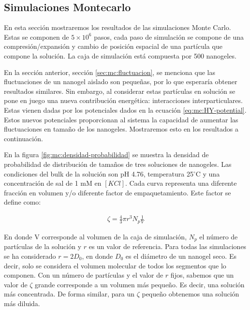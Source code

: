 	
	\subsection{Simulaciones Montecarlo}
	
	En esta secci\'on mostraremos los resultados de las simulaciones Monte Carlo. Estas se componen de  $5\times 10^6$ pasos, cada paso de simulaci\'on se compone de una compresi\'on/expansi\'on y cambio de posici\'on espacial de una part\'icula que compone la soluci\'on. La caja de simulaci\'on est\'a compuesta por 500 nanogeles.
	
	En la secci\'on anterior, secci\'on \ref{sec:mc:fluctuacion}, se menciona que las fluctuaciones de un nanogel aislado son peque\~nas, por lo que esperar\'ia obtener resultados similares. Sin embargo, al considerar estas part\'iculas en soluci\'on se pone en juego una nueva contribuci\'on energ\'etica: interacciones interparticulares. Estas vienen dadas por los potenciales dados en la ecuaci\'on \ref{eq:mc:HY-potential}.
	Estos nuevos potenciales proporcionan al sistema la capacidad de aumentar las fluctuaciones en tama\~no de los nanogeles. Mostraremos esto en los resultados a continuaci\'on.
	
	En la figura \ref{fig:mc:densidad-probabilidad} se muestra la densidad de probabilidad de distribuci\'on de tama\~nos de tres soluciones de nanogeles. Las condiciones del bulk de la soluci\'on son pH 4.76, temperatura 25$^\circ$C y una concentraci\'on de sal de 1 mM en $[KCl]$.
	Cada curva representa una diferente fracci\'on en volumen y/o diferente factor de empaquetamiento. Este factor se define como:
	
	
	
	\begin{align}
		\zeta = \frac{4}{3} \pi r^3 N_p \frac{1}{V}
	\end{align}
	
	En donde V corresponde al volumen de la caja de simulación, $N_p$ el n\'umero de part\'iculas de la soluci\'on y $r$ es un valor de referencia.
	Para todas las simulaciones se ha considerado $r= 2D_0$, en donde $D_0$ es el di\'ametro de un nanogel seco. Es decir, solo se considera el volumen molecular de todos los segmentos que lo componen.
	Con un n\'umero de part\'iculas y el valor de $r$ fijos, sabemos que un valor de $\zeta$ grande corresponde a un volumen m\'as peque\~no. Es decir, una soluci\'on m\'as concentrada.
	De forma similar, para un $\zeta$ peque\~no obtenemos una soluci\'on m\'as diluida.
	
